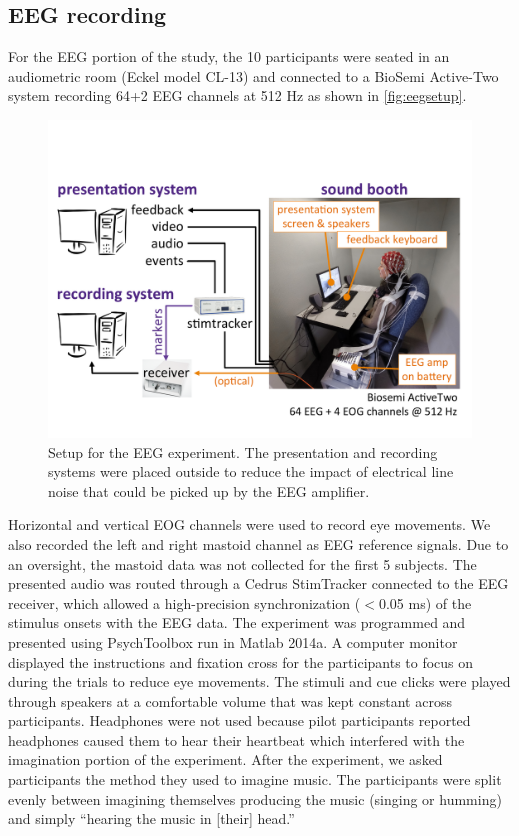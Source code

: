 \subsection{EEG recording}
For the EEG portion of the study, the 10 participants were seated in an audiometric room (Eckel model CL-13) and connected to a BioSemi Active-Two system recording 64+2 EEG channels at 512 Hz as shown in \autoref{fig:eegsetup}.
\begin{figure}[htb]
  \begin{center}
    \includegraphics[scale=0.5]{Figures/EEG-setup.pdf}
    \caption{%
Setup for the EEG experiment.
The presentation and recording systems were placed outside to reduce the impact of electrical line noise that could be picked up by the EEG amplifier.
}
    \label{fig:eegsetup}
  \end{center}
\end{figure}
Horizontal and vertical EOG channels were used to record eye movements. 
We also recorded the left and right mastoid channel as EEG reference signals. 
Due to an oversight, the mastoid data was not collected for the first 5 subjects.
The presented audio %
was routed through a Cedrus StimTracker connected to the EEG receiver, which allowed a high-precision synchronization ($<$0.05 ms) of the stimulus onsets with the \ac{EEG} data.
The experiment was programmed and presented using PsychToolbox run in Matlab 2014a. 
A computer monitor displayed the instructions and fixation cross for the participants to focus on during the trials to reduce eye movements.
The stimuli and cue clicks were played through speakers at a comfortable volume that was kept constant across participants. Headphones were not used because pilot participants reported headphones caused them to hear their heartbeat which interfered with the imagination portion of the experiment. 
After the experiment, we asked participants the method they used to imagine music. 
The participants were split evenly between imagining themselves producing the music (singing or humming) and simply ``hearing the music in [their] head.'' 

